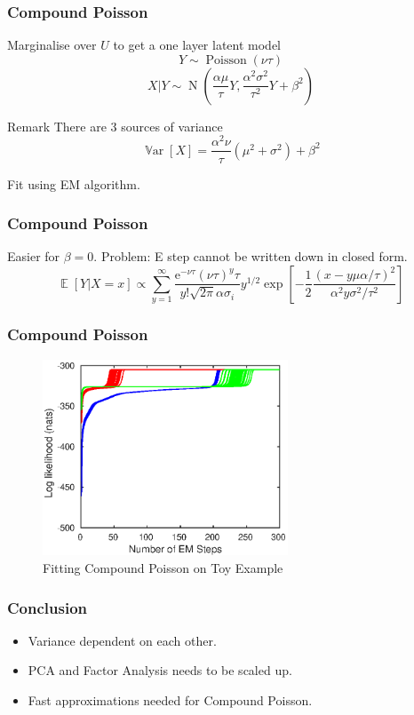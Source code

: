\documentclass{beamer}
\DeclareMathOperator{\expectation}{\mathbb{E}}
\DeclareMathOperator{\variance}{\mathbb{V}ar}
\DeclareMathOperator{\normal}{N}
\DeclareMathOperator{\poisson}{Poisson}
\newcommand{\euler}{\mathrm{e}}
\begin{document}
\begin{frame}
\frametitle{Compound Poisson}
Marginalise over $U$ to get a one layer latent model
\pause
\begin{equation}
Y\sim\poisson(\nu\tau)
\end{equation}
\begin{equation}
X|Y\sim\normal\left(
\frac{\alpha\mu}{\tau}Y,\frac{\alpha^2\sigma^2}{\tau^2}Y+\beta^2
\right)
\end{equation}
\pause
\begin{block}{Remark}
There are 3 sources of variance
\begin{equation}
\variance[X] = \frac{\alpha^2\nu}{\tau}\left(\mu^2+\sigma^2\right)+\beta^2
\end{equation}
\end{block}
\pause
Fit using EM algorithm.
\end{frame}

\begin{frame}
\frametitle{Compound Poisson}
Easier for $\beta=0$. Problem: E step cannot be written down in closed form.
\begin{equation}
\expectation\left[Y|X=x\right]\propto
\sum_{y=1}^{\infty}\dfrac{\euler^{-\nu\tau}(\nu\tau)^{y}\tau}{y!\sqrt{2\pi}\alpha\sigma_i}y^{1/2}
\exp\left[-\dfrac{1}{2}\dfrac{\left(x-y\mu\alpha/\tau\right)^2}{\alpha^2y\sigma^2/\tau^2}\right]
\end{equation}
\end{frame}

\begin{frame}
\frametitle{Compound Poisson}
\begin{figure}
	\includegraphics[width=0.65\textwidth]{figures/hierarchicalModel/EM_initial_lnL.eps}
	\caption{Fitting Compound Poisson on Toy Example}
\end{figure}
\end{frame}

\begin{frame}
\frametitle{Conclusion}
\begin{itemize}
	\item Variance dependent on each other.
	\item PCA and Factor Analysis needs to be scaled up.
	\item Fast approximations needed for Compound Poisson.
\end{itemize}
\end{frame}
\end{document}

